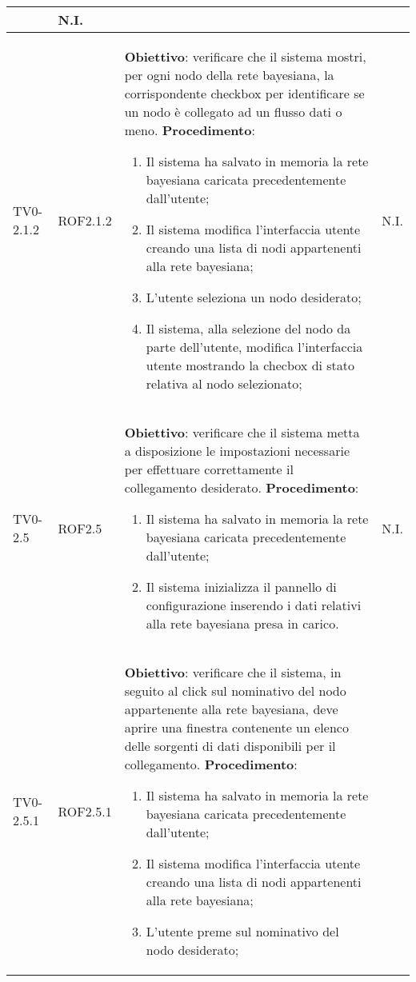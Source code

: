 \begin{longtable}{|m{}|m{}|m{}|m{}|}
\begin{enumerate}
	\end{enumerate}
	& N.I. \\ 
\hline
TV0-2.1.2 & ROF2.1.2& 
	\textbf{Obiettivo}: verificare che il sistema mostri, per ogni nodo della rete bayesiana, la corrispondente checkbox per identificare se un nodo è collegato ad un flusso dati o meno. \newline
	\textbf{Procedimento}: 
	\begin{enumerate}
		\item Il sistema ha salvato in memoria la rete bayesiana caricata precedentemente dall'utente; 
		\item Il sistema modifica l'interfaccia utente creando una lista di nodi appartenenti alla rete bayesiana; 
		\item L'utente seleziona un nodo desiderato; 
		\item Il sistema, alla selezione del nodo da parte dell'utente, modifica l'interfaccia utente mostrando la checbox di stato relativa al nodo selezionato; 		
	\end{enumerate}
	& N.I. \\
\hline
\rowcolor{grigio} TV0-2.5 & ROF2.5 & 
	\textbf{Obiettivo}: verificare che il sistema metta a disposizione le impostazioni necessarie per effettuare correttamente il collegamento desiderato. \newline
	\textbf{Procedimento}: 
	\begin{enumerate}
		\item Il sistema ha salvato in memoria la rete bayesiana caricata precedentemente dall'utente; 
		\item Il sistema inizializza il pannello di configurazione inserendo i dati relativi alla rete bayesiana presa in carico. 
	\end{enumerate}
	& N.I. \\
\hline
TV0-2.5.1 & ROF2.5.1 & 
 	\textbf{Obiettivo}: verificare che il sistema, in seguito al click sul nominativo del nodo appartenente alla rete bayesiana, deve aprire una finestra contenente un elenco delle sorgenti di dati disponibili per il collegamento. \newline
 	\textbf{Procedimento}: 
 	\begin{enumerate}
 		\item Il sistema ha salvato in memoria la rete bayesiana caricata precedentemente dall'utente; 
 		\item Il sistema modifica l'interfaccia utente creando una lista di nodi appartenenti alla rete bayesiana; 
 		\item L'utente preme sul nominativo del nodo desiderato; 

\end{enumerate}
\end{longtable}
